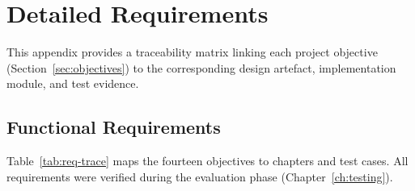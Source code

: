 ﻿%
\chapter{Detailed Requirements}
\label{app:requirements}

This appendix provides a traceability matrix linking each project objective
(Section~\ref{sec:objectives}) to the corresponding design artefact, implementation
module, and test evidence.

\section{Functional Requirements}

Table~\ref{tab:req-trace} maps the fourteen objectives to chapters and test cases.
All requirements were verified during the evaluation phase
(Chapter~\ref{ch:testing}).

